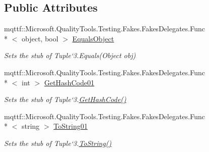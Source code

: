 \subsection*{Public Attributes}
\begin{DoxyCompactItemize}
\item 
mqttf\-::\-Microsoft.\-Quality\-Tools.\-Testing.\-Fakes.\-Fakes\-Delegates.\-Func\\*
$<$ object, bool $>$ \hyperlink{class_system_1_1_fakes_1_1_stub_tuple_3_01_t1_00_01_t2_00_01_t3_01_4_a2d0bd144af94dd9579e86663ea07d566}{Equals\-Object}
\begin{DoxyCompactList}\small\item\em Sets the stub of Tuple`3.Equals(\-Object obj)\end{DoxyCompactList}\item 
mqttf\-::\-Microsoft.\-Quality\-Tools.\-Testing.\-Fakes.\-Fakes\-Delegates.\-Func\\*
$<$ int $>$ \hyperlink{class_system_1_1_fakes_1_1_stub_tuple_3_01_t1_00_01_t2_00_01_t3_01_4_af70461073a204d3089802596172bc8de}{Get\-Hash\-Code01}
\begin{DoxyCompactList}\small\item\em Sets the stub of Tuple`3.\hyperlink{class_system_1_1_fakes_1_1_stub_tuple_3_01_t1_00_01_t2_00_01_t3_01_4_a4143fac8a7eb9056474428f11df991aa}{Get\-Hash\-Code()}\end{DoxyCompactList}\item 
mqttf\-::\-Microsoft.\-Quality\-Tools.\-Testing.\-Fakes.\-Fakes\-Delegates.\-Func\\*
$<$ string $>$ \hyperlink{class_system_1_1_fakes_1_1_stub_tuple_3_01_t1_00_01_t2_00_01_t3_01_4_acab2a6e1296be8c19176fd35b5c61ea9}{To\-String01}
\begin{DoxyCompactList}\small\item\em Sets the stub of Tuple`3.\hyperlink{class_system_1_1_fakes_1_1_stub_tuple_3_01_t1_00_01_t2_00_01_t3_01_4_a0da1e81ee8fdc2cc26daf43d40ced721}{To\-String()}\end{DoxyCompactList}\end{DoxyCompactItemize}
